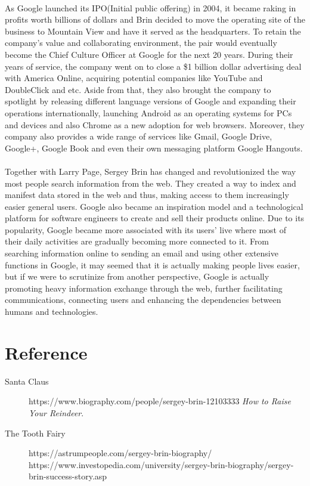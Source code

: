 \documentclass[12pt]{article}
\begin{document}
\paragraph{}
As Google launched its IPO(Initial public offering) in 2004, it became raking in profits worth billions of dollars and Brin decided to move the operating site of the business to Mountain View and have it served as the headquarters. To retain the company's value and collaborating environment, the pair would eventually become the Chief Culture Officer at Google for the next 20 years. During their years of service, the company went on to close a \$1 billion dollar advertising deal with America Online, acquiring potential companies like YouTube and DoubleClick and etc. Aside from that, they also brought the company to spotlight by releasing different language versions of Google and expanding their operations internationally, launching Android as an operating systems for PCs and devices and also Chrome as a new adoption for web browsers. Moreover, they company also provides a wide range of services like Gmail, Google Drive, Google+, Google Book and even their own messaging platform Google Hangouts.

\paragraph{}
Together with Larry Page, Sergey Brin has changed and revolutionized the way most people search information from the web. They created a way to index and manifest data stored in the web and thus, making access to them increasingly easier general users. Google also became an inspiration model and a technological platform for software engineers to create and sell their products online. Due to its popularity, Google became more associated with its users' live where most of their daily activities are gradually becoming more connected to it. From searching information online to sending an email and using other extensive functions in Google, it may seemed that it is actually making people lives easier, but if we were to scrutinize from another perspective, Google is actually promoting heavy information exchange through the web, further facilitating communications, connecting users and enhancing the dependencies between humans and technologies.
\bigskip\noindent

\section*{Reference}

\begin{description}
    \item[Santa Claus] https://www.biography.com/people/sergey-brin-12103333 
    \emph{How to Raise Your Reindeer}.
    \item[The Tooth Fairy] https://astrumpeople.com/sergey-brin-biography/ \\
    https://www.investopedia.com/university/sergey-brin-biography/sergey-brin-success-story.asp
\end{description}
\end{document}
